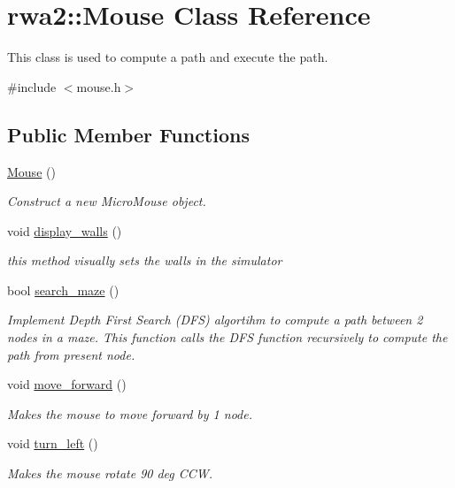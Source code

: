\hypertarget{classrwa2_1_1_mouse}{}\section{rwa2\+:\+:Mouse Class Reference}
\label{classrwa2_1_1_mouse}


This class is used to compute a path and execute the path.  




{\ttfamily \#include $<$mouse.\+h$>$}

\subsection*{Public Member Functions}
\begin{DoxyCompactItemize}
\item 
\hyperlink{classrwa2_1_1_mouse_a048dffae3aaa3a6ddc2c6cc4741a097c}{Mouse} ()
\begin{DoxyCompactList}\small\item\em Construct a new Micro\+Mouse object. \end{DoxyCompactList}\item 
void \hyperlink{classrwa2_1_1_mouse_abbcc99c41fd073426fdfd790f947956e}{display\+\_\+walls} ()
\begin{DoxyCompactList}\small\item\em this method visually sets the walls in the simulator \end{DoxyCompactList}\item 
bool \hyperlink{classrwa2_1_1_mouse_a789be287a432bafc903c97396a014d7d}{search\+\_\+maze} ()
\begin{DoxyCompactList}\small\item\em Implement Depth First Search (D\+FS) algortihm to compute a path between 2 nodes in a maze. This function calls the D\+FS function recursively to compute the path from present node. \end{DoxyCompactList}\item 
void \hyperlink{classrwa2_1_1_mouse_afc6e0d56e3a777c05efa3929eb256e0a}{move\+\_\+forward} ()
\begin{DoxyCompactList}\small\item\em Makes the mouse to move forward by 1 node. \end{DoxyCompactList}\item 
void \hyperlink{classrwa2_1_1_mouse_a5748e94e740432c334d15364fb476919}{turn\+\_\+left} ()
\begin{DoxyCompactList}\small\item\em Makes the mouse rotate 90 deg C\+CW. \end{DoxyCompactList}\item 

\end{DoxyCompactItemize}
